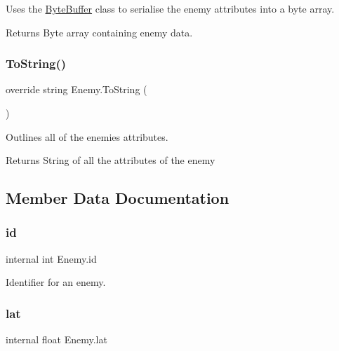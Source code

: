 Uses the \mbox{\hyperlink{class_byte_buffer}{Byte\+Buffer}} class to serialise the enemy attributes into a byte array. 

\begin{DoxyReturn}{Returns}
Byte array containing enemy data.
\end{DoxyReturn}
\mbox{\label{class_enemy_a9e96feb153ffddecf46557ed57059289}} 
\subsubsection{\texorpdfstring{ToString()}{ToString()}}
{\footnotesize\ttfamily override string Enemy.\+To\+String (\begin{DoxyParamCaption}{ }\end{DoxyParamCaption})}



Outlines all of the enemies attributes. 

\begin{DoxyReturn}{Returns}
String of all the attributes of the enemy
\end{DoxyReturn}


\subsection{Member Data Documentation}
\mbox{\label{class_enemy_a2462522193197ea0458942f19704599b}} 
\subsubsection{\texorpdfstring{id}{id}}
{\footnotesize\ttfamily internal int Enemy.\+id\hspace{0.3cm}{\ttfamily [private]}}



Identifier for an enemy. 

\mbox{\label{class_enemy_adda4a5f0af5eb4dc061e162ee46e940c}} 
\subsubsection{\texorpdfstring{lat}{lat}}
{\footnotesize\ttfamily internal float Enemy.\+lat\hspace{0.3cm}{\ttfamily [private]}}




